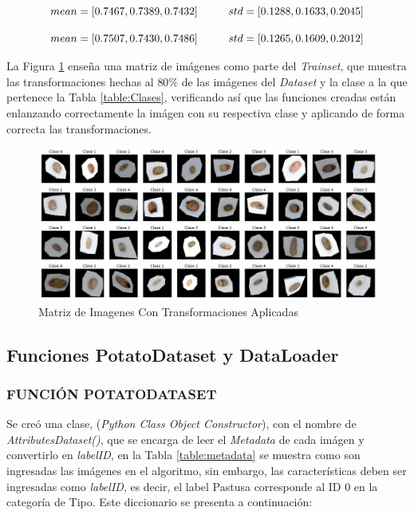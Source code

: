 			\begin{equation}				{mean = [0.7467, 0.7389, 0.7432] \hspace*{1cm}  std  = [0.1288, 0.1633, 0.2045]}
				\label{eq:meanstd1}
			\end{equation}


			\begin{equation}
				{mean = [0.7507, 0.7430, 0.7486] \hspace*{1cm}  std  = [0.1265, 0.1609, 0.2012]}
				\label{eq:meanstd2}
			\end{equation}


			La Figura \ref{fig:agumentation} enseña una matriz de imágenes como parte del \textit{Trainset}, que muestra las transformaciones hechas al $80\%$ de las imágenes del \textit{Dataset} y la clase a la que pertenece la Tabla \ref{table:Clases}, verificando así que las funciones creadas están enlanzando correctamente la imágen con su respectiva clase y aplicando de forma correcta las transformaciones.

			\newpage
			\begin{figure}[ht]
				\centering
				\includegraphics[scale=0.4]{Figs/augmentation.png}
				\caption{Matriz de Imagenes Con Transformaciones Aplicadas}
				\label{fig:agumentation}
			\end{figure}	

		\subsection{Funciones PotatoDataset y DataLoader}
		
		
			\subsubsection{FUNCIÓN POTATODATASET}
			
			Se creó una clase, (\textit{Python Class Object Constructor}), con el nombre de \textit{AttributesDataset()}, que se encarga de leer el \textit{Metadata}  de cada imágen y convertirlo en \textit{labelID}, en la Tabla \ref{table:metadata} se muestra como son ingresadas las imágenes en el algoritmo, sin embargo, las características deben ser ingresadas como \textit{labelID}, es decir, el label Pastusa corresponde al ID 0 en la categoría de Tipo. Este diccionario se presenta a continuación:			
	
